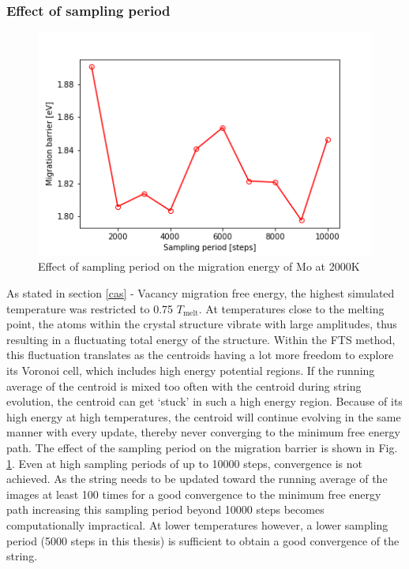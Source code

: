 \documentclass{article}
\begin{document}
\subsubsection{Effect of sampling period}\label{sample}

\begin{figure}[!htp]
\centering
\includegraphics[scale=0.65]{sample_bcc}
\caption{Effect of sampling period on the migration energy of Mo at 2000K}
\label{fig:22}
\end{figure}

As stated in section \ref{cas}  - Vacancy migration free energy, the highest simulated temperature was restricted to 0.75 $T_{\mathrm{melt}}$. At temperatures close to the melting point, the atoms within the crystal structure vibrate with large amplitudes, thus resulting in a fluctuating total energy of the structure. Within the FTS method, this fluctuation translates as the centroids having a lot more freedom to explore its Voronoi cell, which includes high energy potential regions. If the running average of the centroid is mixed too often with the centroid during string evolution, the centroid can get \enquote*{stuck} in such a high energy region. Because of its high energy at high temperatures, the centroid will continue evolving in the same manner with every update, thereby never converging to the minimum free energy path. The effect of the sampling period on the migration barrier is shown in Fig. \ref{fig:22}. Even at high sampling periods of up to 10000 steps, convergence is not achieved. As the string needs to be updated toward the running average of the images at least 100 times for a good convergence to the minimum free energy path increasing this sampling period beyond 10000 steps becomes computationally impractical. At lower temperatures however, a lower sampling period (5000 steps in this thesis) is sufficient to obtain a good convergence of the string. 
\end{document}
